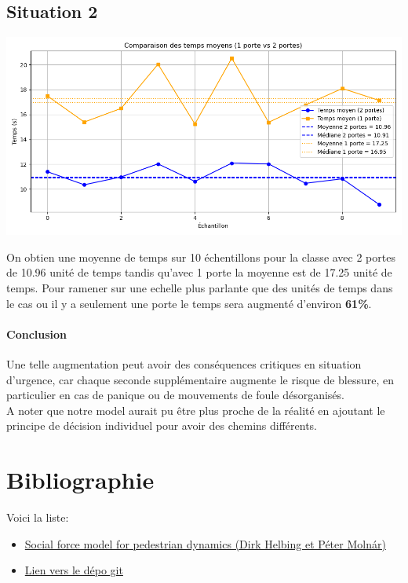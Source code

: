 \documentclass[a4paper,12pt]{article}
\begin{document}
\subsection{Situation 2}


\includegraphics[width=\textwidth]{resultat_2.png} %

On obtien une moyenne de temps sur 10 échentillons pour la classe avec 2 portes de 10.96 unité de temps tandis qu'avec 1 porte la moyenne est de 17.25 unité de temps. Pour ramener sur une echelle plus parlante que des unités de temps dans le cas ou il y a seulement une porte le temps sera augmenté d'environ \textbf{61\%}. 
\paragraph{Conclusion} Une telle augmentation peut avoir des conséquences critiques en situation d'urgence, car chaque seconde supplémentaire augmente le risque de blessure, en particulier en cas de panique ou de mouvements de foule désorganisés. \\ \indent A noter que notre model aurait pu être plus proche de la réalité en ajoutant le principe de décision individuel pour avoir des chemins différents.

\newpage



\section{Bibliographie}

Voici la liste:

\vspace{1em}

\begin{itemize}
	\item \href{https://journals.aps.org/pre/abstract/10.1103/PhysRevE.51.4282}{Social force model for pedestrian dynamics (Dirk Helbing et Péter Molnár)}
	\item \href{https://github.com/antoninnad/etude_des_foules}{Lien vers le dépo git}
\end{itemize}
\end{document}
